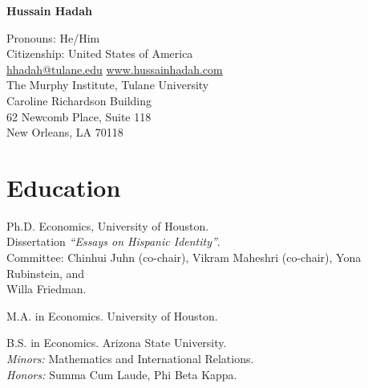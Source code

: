 \documentclass[letterpaper]{article}
\def\name{Hussain Hadah}
\renewenvironment{itemize}{
  \begin{list}{}{
    \setlength{\leftmargin}{1.5em}
  }
}{
  \end{list}
}
\begin{document}
\centerline{\huge \bf \name}

\begin{center}
   \hspace{0.5mm} Pronouns: He/Him \href{https://www.mypronouns.org/}{\faQuestionCircleO}  
\\    
\hspace{0.5mm} Citizenship: United States of America
\\
\faEnvelopeO \hspace{0.5mm} \href{mailto:hhadah@tulane.edu}{hhadah@tulane.edu} \rm  \hspace{0.5mm} \faGlobe \hspace{0.5mm} \href{https://www.hussainhadah.com/}{www.hussainhadah.com} 
\href{https://www.linkedin.com/in/hussain-hadah/}{\faLinkedinSquare} \href{https://github.com/hhadah}{\faGithub} 
\\ The Murphy Institute, Tulane University \\
Caroline Richardson Building \\
62 Newcomb Place, Suite 118 \\
New Orleans, LA 70118\\
  
\end{center}


\section*{Education}
\vspace{2 mm}
\begin{itemize}
  \item {}Ph.D. Economics, University of Houston. \\{\makebox[1.8cm]{\hfill}}Dissertation \textit{“Essays on Hispanic Identity”}. \\{\makebox[1.8cm]{\hfill}}Committee: Chinhui Juhn (co-chair), Vikram Maheshri (co-chair), Yona Rubinstein, and \\{\makebox[1.8cm]{\hfill}}Willa Friedman.
  \item {}M.A. in Economics. University of Houston. 
  \item {}B.S. in Economics.  Arizona State University. \\{\makebox[1.8cm]{\hfill}}\textit{Minors:} Mathematics and International Relations. \\{\makebox[1.8cm]{\hfill}}\textit{Honors:} Summa Cum Laude, Phi Beta Kappa.
\end{itemize}
\vspace{2 mm}
\end{document}
